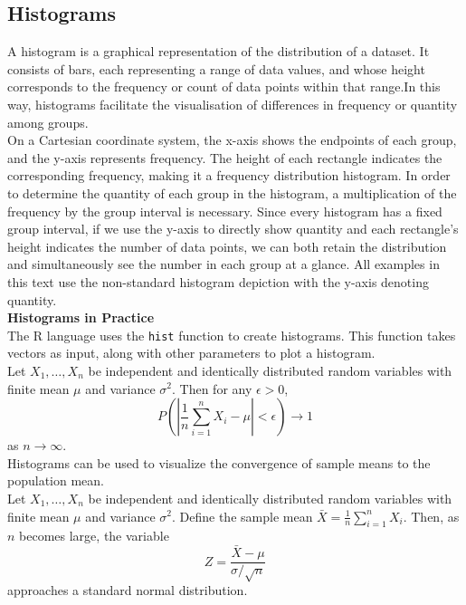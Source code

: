 \documentclass{article}\usepackage[]{graphicx}\usepackage[]{xcolor}
\numberwithin{equation}{section}
\begin{document}
\subsection{Histograms}

A histogram is a graphical representation of the distribution of a dataset. It consists of bars, each representing a range of data values, and whose height corresponds to the frequency or count of data points within that range.In this way, histograms facilitate the visualisation of differences in frequency or quantity among groups.\\

\noindent On a Cartesian coordinate system, the x-axis shows the endpoints of each group, and the y-axis represents frequency. The height of each rectangle indicates the corresponding frequency, making it a frequency distribution histogram. In order to determine the quantity of each group in the histogram, a multiplication of the frequency by the group interval is necessary. Since every histogram has a fixed group interval, if we use the y-axis to directly show quantity and each rectangle's height indicates the number of data points, we can both retain the distribution and simultaneously see the number in each group at a glance. All examples in this text use the non-standard histogram depiction with the y-axis denoting quantity.\\

\noindent
\textbf{Histograms in Practice}\\
\noindent The R language uses the \texttt{hist} function to create histograms. This function takes vectors as input, along with other parameters to plot a histogram.\\

\noindent Let \(X_1, \ldots, X_n\) be independent and identically distributed random variables with finite mean \( \mu \) and variance \( \sigma^2 \). Then for any \( \epsilon > 0 \), 
\[ P\left(\left|\frac{1}{n}\sum_{i=1}^n X_i - \mu\right| < \epsilon\right) \rightarrow 1 \] 
as \( n \rightarrow \infty \).\\

\noindent Histograms can be used to visualize the convergence of sample means to the population mean.\\

\noindent Let \(X_1, \ldots, X_n\) be independent and identically distributed random variables with finite mean \( \mu \) and variance \( \sigma^2 \). Define the sample mean \( \bar{X} = \frac{1}{n}\sum_{i=1}^n X_i \). Then, as \( n \) becomes large, the variable 
\[ Z = \frac{\bar{X} - \mu}{\sigma/\sqrt{n}} \] approaches a standard normal distribution.\\
\end{document}
